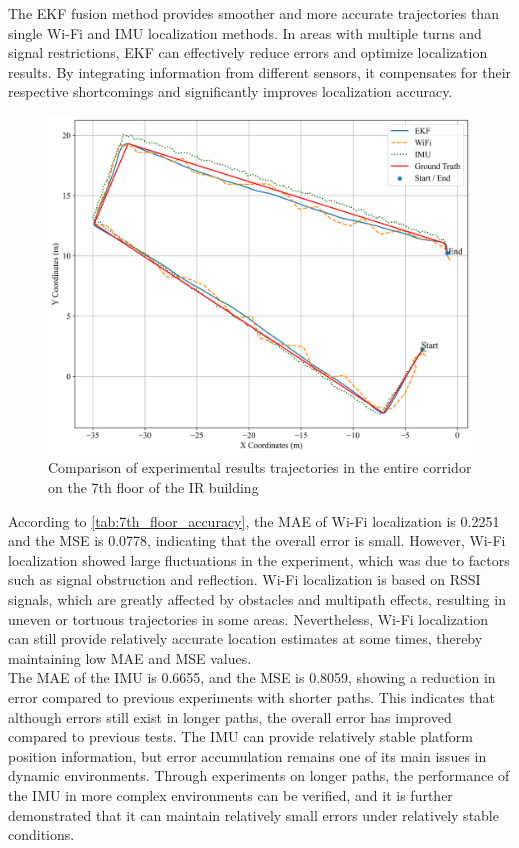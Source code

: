 \documentclass[12pt,a4paper]{article}
\numberwithin{equation}{section}
\begin{document}
The EKF fusion method provides smoother and more accurate trajectories than single Wi-Fi and IMU localization methods. In areas with multiple turns and signal restrictions, EKF can effectively reduce errors and optimize localization results. By integrating information from different sensors, it compensates for their respective shortcomings and significantly improves localization accuracy.
\begin{figure}[H]
    \centering
    \includegraphics[width=0.8\linewidth]{images/1/3.png}
    \caption{Comparison of experimental results trajectories in the entire corridor on the 7th floor of the IR building}
    \label{fig:ir_full_7}
\end{figure}
\noindent According to \autoref{tab:7th_floor_accuracy}, the MAE of Wi-Fi localization is 0.2251 and the MSE is 0.0778, indicating that the overall error is small. However, Wi-Fi localization showed large fluctuations in the experiment, which was due to factors such as signal obstruction and reflection. Wi-Fi localization is based on RSSI signals, which are greatly affected by obstacles and multipath effects, resulting in uneven or tortuous trajectories in some areas. Nevertheless, Wi-Fi localization can still provide relatively accurate location estimates at some times, thereby maintaining low MAE and MSE values.\\
The MAE of the IMU is 0.6655, and the MSE is 0.8059, showing a reduction in error compared to previous experiments with shorter paths. This indicates that although errors still exist in longer paths, the overall error has improved compared to previous tests. The IMU can provide relatively stable platform position information, but error accumulation remains one of its main issues in dynamic environments. Through experiments on longer paths, the performance of the IMU in more complex environments can be verified, and it is further demonstrated that it can maintain relatively small errors under relatively stable conditions.
\end{document}
